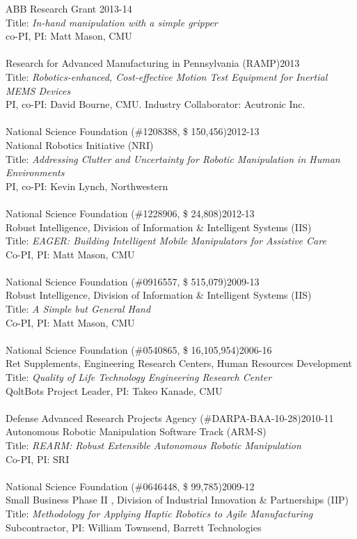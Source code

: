 ABB Research Grant \hfill 2013-14\\
Title: \textit{In-hand manipulation with a simple gripper}\\
co-PI, PI: Matt Mason, CMU\\
\\
Research for Advanced Manufacturing in Pennsylvania (RAMP)\hfill 2013\\
Title: \textit{Robotics-enhanced, Cost-effective Motion Test Equipment for Inertial MEMS Devices}\\
PI, co-PI: David Bourne, CMU. Industry Collaborator: Acutronic Inc.\\
\\
National Science Foundation (\#1208388, \$ 150,456)\hfill 2012-13\\
National Robotics Initiative (NRI)\\
Title: \textit{Addressing Clutter and Uncertainty for Robotic Manipulation in Human Environments}\\
PI, co-PI: Kevin Lynch, Northwestern\\
\\
National Science Foundation (\#1228906, \$ 24,808)\hfill 2012-13\\
Robust Intelligence, Division of Information \& Intelligent Systems (IIS)\\
Title: \textit{ EAGER: Building Intelligent Mobile Manipulators for Assistive Care
}\\
Co-PI, PI: Matt Mason, CMU\\
\\
National Science Foundation (\#0916557, \$ 515,079)\hfill 2009-13\\
Robust Intelligence, Division of Information \& Intelligent Systems (IIS)\\
Title: \textit{A Simple but General Hand}\\
Co-PI, PI: Matt Mason, CMU\\
\\
National Science Foundation (\#0540865, \$ 16,105,954)\hfill 2006-16\\
Ret Supplements, Engineering Research Centers, Human Resources Development\\
Title: \textit{Quality of Life Technology Engineering Research Center}\\
QoltBots Project Leader, PI: Takeo Kanade, CMU\\
\\
Defense Advanced Research Projects Agency (\#DARPA-BAA-10-28)\hfill 2010-11\\
Autonomous Robotic Manipulation Software Track (ARM-S)\\
Title: \textit{REARM: Robust Extensible Autonomous Robotic Manipulation}\\
Co-PI, PI: SRI\\
\\
National Science Foundation (\#0646448, \$ 99,785)\hfill 2009-12\\
Small Business Phase II , Division of Industrial Innovation \& Partnerships (IIP)\\
Title: \textit{Methodology for Applying Haptic Robotics to Agile Manufacturing}\\
Subcontractor, PI: William Townsend, Barrett Technologies\\
